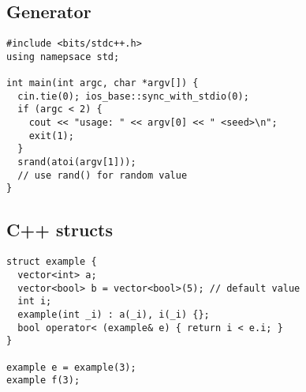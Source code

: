 \documentclass[12pt, a4paper, twoside]{article}
\begin{document}
\subsection{Generator}
\begin{lstlisting}
#include <bits/stdc++.h>
using namepsace std;

int main(int argc, char *argv[]) {
  cin.tie(0); ios_base::sync_with_stdio(0);
  if (argc < 2) {
    cout << "usage: " << argv[0] << " <seed>\n";
    exit(1);
  }
  srand(atoi(argv[1]));
  // use rand() for random value
}
\end{lstlisting}

\subsection{C++ structs}
\begin{lstlisting}
struct example {
  vector<int> a;
  vector<bool> b = vector<bool>(5); // default value
  int i;
  example(int _i) : a(_i), i(_i) {};
  bool operator< (example& e) { return i < e.i; }
}

example e = example(3);
example f(3);
\end{lstlisting}

\pagebreak
\end{document}
